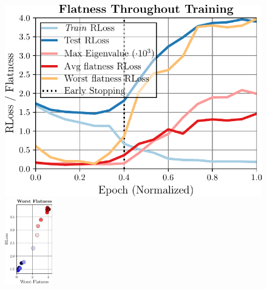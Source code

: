 \begin{figure}[t]
	\centering
	\vspace*{-0.2cm}
	\hspace*{-0.1cm}
	\begin{minipage}[t]{0.29\textwidth}
		\vspace*{0px}
		
		\includegraphics[width=1\textwidth]{plots_main_flatness_epochs}
	\end{minipage}
	\begin{minipage}[t]{0.015\textwidth}
		\vspace*{0px}
		
		\hspace*{4px}{\color{black!75}\rule{0.65px}{3.8cm}}
	\end{minipage}
	\begin{minipage}[t]{0.12\textwidth}
		\vspace*{0px}
		
		\includegraphics[height=3.7cm]{plots_main_flatness_epochs_correlation_joint}
	\end{minipage}
	\begin{minipage}[t]{0.12\textwidth}
		\vspace*{0px}
		

\end{minipage}
\end{figure}
